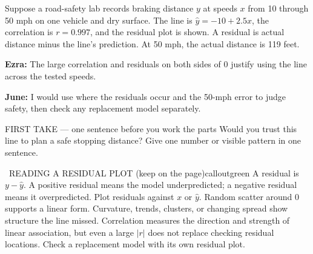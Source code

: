 \documentclass[11pt]{article}
\begin{document}
\clearpage
{}

Suppose a road-safety lab records braking distance $y$ at speeds $x$ from 10 through 50 mph on one vehicle and dry surface. The line is $\hat y=-10+2.5x$, the correlation is $r=0.997$, and the residual plot is shown. A residual is actual distance minus the line's prediction. At 50 mph, the actual distance is 119 feet.\par\smallskip \textbf{Ezra:} The large correlation and residuals on both sides of 0 justify using the line across the tested speeds.\par \textbf{June:} I would use where the residuals occur and the 50-mph error to judge safety, then check any replacement model separately.\par
\begin{center}
\end{center}
\begin{firsttakebox}{FIRST TAKE --- one sentence before you work the parts}
Would you trust this line to plan a safe stopping distance? Give one number or visible pattern in one sentence.\par
{}
\end{firsttakebox}

\begin{callout}{\IconBook\ READING A RESIDUAL PLOT (keep on the page)}{calloutgreen}
A residual is $y-\hat y$. A positive residual means the model underpredicted;
a negative residual means it overpredicted. Plot residuals against $x$ or $\hat y$.
Random scatter around 0 supports a linear form. Curvature, trends, clusters, or
changing spread show structure the line missed. Correlation measures the direction
and strength of linear association, but even a large $|r|$ does not replace checking
residual locations. Check a replacement model with its own residual plot.
\end{callout}
\end{document}
